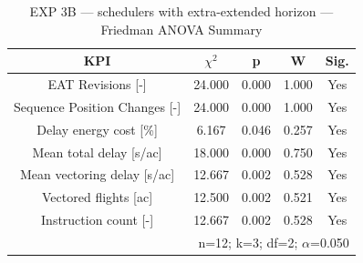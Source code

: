 \begin{table}[!t]
\caption{EXP 3B — schedulers with extra-extended horizon — Friedman ANOVA Summary}
\begin{center}
\footnotesize
\setlength{\tabcolsep}{3pt}
\renewcommand{\arraystretch}{1.000}
\begin{tabular}{|c|c|c|c|c|}
\hline
\textbf{KPI} & \textbf{$\chi^2$} & \textbf{p} & \textbf{W} & \textbf{Sig.} \\
\hline
EAT Revisions [-] & 24.000 & 0.000 & 1.000 & Yes \\
\hline
Sequence Position Changes [-] & 24.000 & 0.000 & 1.000 & Yes \\
\hline
Delay energy cost [\%] & 6.167 & 0.046 & 0.257 & Yes \\
\hline
Mean total delay [s/ac] & 18.000 & 0.000 & 0.750 & Yes \\
\hline
Mean vectoring delay [s/ac] & 12.667 & 0.002 & 0.528 & Yes \\
\hline
Vectored flights [ac] & 12.500 & 0.002 & 0.521 & Yes \\
\hline
Instruction count [-] & 12.667 & 0.002 & 0.528 & Yes \\
\hline
\multicolumn{5}{r}{n=12; k=3; df=2; $\alpha$=0.050}\\
\end{tabular}
\label{tab:exp\_3b\_schedulers\_with\_extra-extended\_horizon\_friedman}
\end{center}
\end{table}